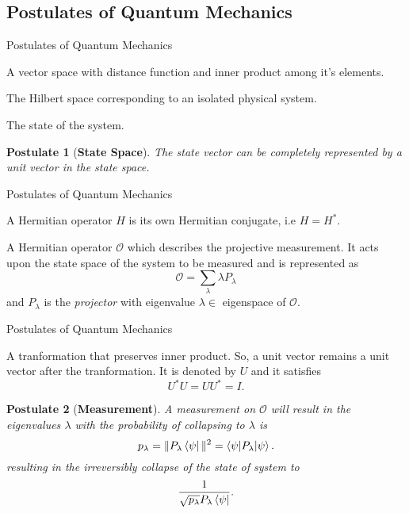 \documentclass[aspectratio=169, handout]{beamer}
\theoremstyle{example}
\newtheorem{postulate}{Postulate}
\begin{document}
\subsection{Postulates of Quantum Mechanics}
\begin{frame}{Postulates of Quantum Mechanics}
\pause\begin{definition}
A vector space with distance function and inner product among it's elements.
\end{definition}
\pause\begin{definition}
The Hilbert space corresponding to an isolated physical system.
\end{definition}
\pause\begin{definition}
The state of the system.
\end{definition}
\pause\begin{postulate}[\textbf{State Space}]
The state vector can be completely represented by a unit vector in the state space.
\end{postulate}
\end{frame}
\begin{frame}{Postulates of Quantum Mechanics}
\pause\begin{definition}
A Hermitian operator $H$ is its own Hermitian conjugate, i.e $H = H^*$.
\end{definition}
\pause\begin{definition}[Observable]
A Hermitian operator $\mathcal{O}$ which describes the projective measurement. It acts upon the state space of the system to be measured and is represented as 
\[\mathcal{O} = \sum_{\lambda}\lambda P_\lambda\]
and $P_\lambda$ is the \emph{projector} with eigenvalue $\lambda \in$ eigenspace of $\mathcal{O}$.
\end{definition}
\end{frame}
\begin{frame}{Postulates of Quantum Mechanics}
  \pause\begin{definition}
A tranformation that preserves inner product. So, a unit vector remains a unit vector after the tranformation. It is denoted by $U$ and it satisfies
\[U^*U = UU^* = I.\]
\end{definition}
\pause\begin{postulate}[\textbf{Measurement}]
A measurement on $\mathcal{O}$ will result in the eigenvalues $\lambda$ with the probability of collapsing to $\lambda$ is \[p_\lambda = \|P_\lambda\bra{\psi}\|^2 = \braket{\psi|P_\lambda|\psi}.\]
resulting in the irreversibly collapse of the state of system to
\[\frac{1}{\sqrt{p_\lambda}P_\lambda\bra{\psi}}.\]
\end{postulate}
\end{frame}
\end{document}
